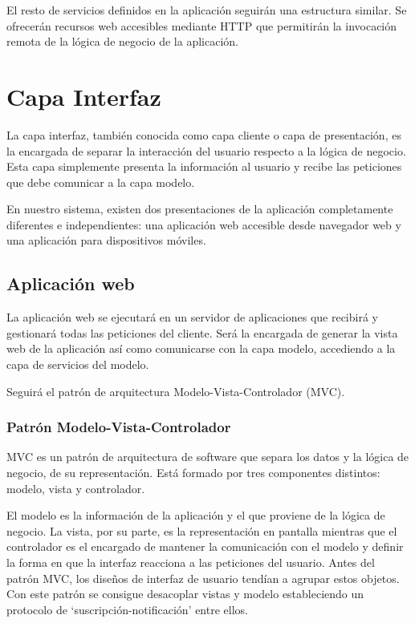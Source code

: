 El resto de servicios definidos en la aplicación seguirán una estructura similar. Se ofrecerán recursos web accesibles mediante HTTP que permitirán la invocación remota de la lógica de negocio de la aplicación.


\section{Capa Interfaz}
La capa interfaz, también conocida como capa cliente o capa de presentación, es la encargada de separar la interacción del usuario respecto a la lógica de negocio. Esta capa simplemente presenta la información al usuario y recibe las peticiones que debe comunicar a la capa modelo.

En nuestro sistema, existen dos presentaciones de la aplicación completamente diferentes e independientes: una aplicación web accesible desde navegador web y una aplicación para dispositivos móviles.

\subsection{Aplicación web}
La aplicación web se ejecutará en un servidor de aplicaciones que recibirá y gestionará todas las peticiones del cliente. Será la encargada de generar la vista web de la aplicación así como comunicarse con la capa modelo, accediendo a la capa de servicios del modelo.

Seguirá el patrón de arquitectura Modelo-Vista-Controlador (MVC).

\subsubsection*{Patrón Modelo-Vista-Controlador}
MVC es un patrón de arquitectura de software que separa los datos y la lógica de negocio, de su representación. Está formado por tres componentes distintos: modelo, vista y controlador.

El modelo es la información de la aplicación y el que proviene de la lógica de negocio. La vista, por su parte, es la representación en pantalla mientras que el controlador es el encargado de mantener la comunicación con el modelo y definir la forma en que la interfaz reacciona a las peticiones del usuario. Antes del patrón MVC, los diseños de interfaz de usuario tendían a agrupar estos objetos. Con este patrón se consigue desacoplar vistas y modelo estableciendo un protocolo de `suscripción-notificación' entre ellos.


